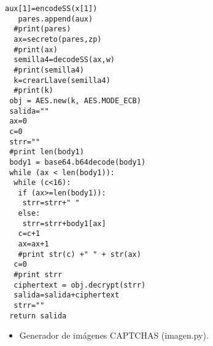 \begin{lstlisting}[frame=single]
   aux[1]=encodeSS(x[1])
   pares.append(aux) 
  #print(pares)
  ax=secreto(pares,zp)
  #print(ax)
  semilla4=decodeSS(ax,w)
  #print(semilla4)
  k=crearLlave(semilla4)
  #print(k)
 obj = AES.new(k, AES.MODE_ECB)
 salida=""
 ax=0
 c=0
 strr=""
 #print len(body1)
 body1 = base64.b64decode(body1)
 while (ax < len(body1)):
  while (c<16):
   if (ax>=len(body1)):
    strr=strr+" "
   else:
    strr=strr+body1[ax]
   c=c+1
   ax=ax+1
   #print str(c) +" " + str(ax) 
  c=0
  #print strr
  ciphertext = obj.decrypt(strr)
  salida=salida+ciphertext
  strr=""
 return salida
\end{lstlisting}

\begin{itemize}
\item Generador de imágenes CAPTCHAS (imagen.py).
\end{itemize}

